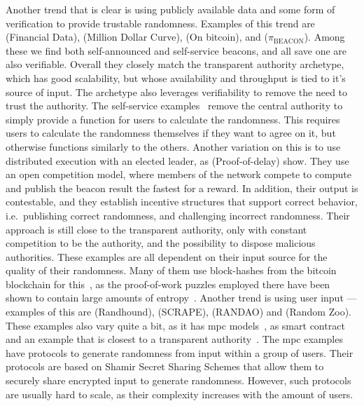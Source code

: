 Another trend that is clear is using publicly available data and some form of verification to provide trustable randomness. Examples of this trend are \citet{clark2010use} (Financial Data), \citet{baigneres2015trap} (Million Dollar Curve), \citet{bonneau2015bitcoin} (On bitcoin), and \citet{bentov2016bitcoin} ($\pi_\text{BEACON}$). Among these we find both self-announced and self-service beacons, and all save one are also verifiable. Overall they closely match the transparent authority archetype, which has good scalability, but whose availability and throughput is tied to it's source of input. The archetype also leverages verifiability to remove the need to trust the authority. The self-service examples~\cite{bonneau2015bitcoin, bentov2016bitcoin} remove the central authority to simply provide a function for users to calculate the randomness. This requires users to calculate the randomness themselves if they want to agree on it, but otherwise functions similarly to the others. Another variation on this is to use distributed execution with an elected leader, as \citet{bunz2017proofsof} (Proof-of-delay) show. They use an open competition model, where members of the network compete to compute and publish the beacon result the fastest for a reward. In addition, their output is contestable, and they establish incentive structures that support correct behavior, i.e.\ publishing correct randomness, and challenging incorrect randomness. Their approach is still close to the transparent authority, only with constant competition to be the authority, and the possibility to dispose malicious authorities. 
These examples are all dependent on their input source for the quality of their randomness. Many of them use block-hashes from the bitcoin blockchain for this~\cite{bonneau2015bitcoin, bentov2016bitcoin, bunz2017proofsof}, as the proof-of-work puzzles employed there have been shown to contain large amounts of entropy~\cite{bonneau2015bitcoin}.  %
Another trend is using user input --- examples of this are \citet{syta2017scalable} (Randhound), \citet{cascudo2017scrape} (SCRAPE), \citet{randao} (RANDAO) and \citet{lenstra2015random} (Random Zoo). These examples also vary quite a bit, as it has \gls{mpc} models~\cite{syta2017scalable, cascudo2017scrape}, as smart contract~\cite{randao} and an example that is closest to a transparent authority~\cite{lenstra2015random}. The \gls{mpc} examples have protocols to generate randomness from input within a group of users. Their protocols are based on Shamir Secret Sharing Schemes that allow them to securely share encrypted input to generate randomness. However, such protocols are usually hard to scale, as their complexity increases with the amount of users.

